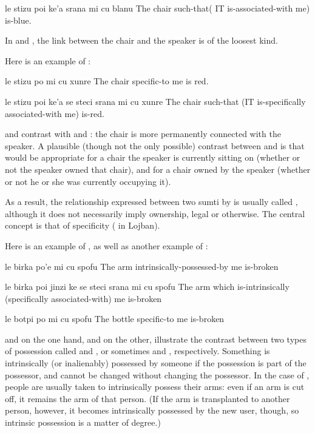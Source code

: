 \begin{example}
le stizu poi ke'a srana mi\n
\T	cu blanu\n
The chair such-that( IT is-associated-with me)\n
\T	is-blue.
\end{example}

In  and , the link between the chair and
    the speaker is of the loosest kind.

Here is an example of :
\begin{example}
le stizu po mi cu xunre\n
The chair specific-to me is red.
\end{example}

\begin{example}
le stizu poi\n
\T	ke'a se steci srana mi cu xunre\n
The chair such-that\n
\T	(IT is-specifically associated-with me) is-red.
\end{example}

 and  contrast with  and : the chair is more permanently
    connected with the speaker. A plausible (though not the only
    possible) contrast between  and
     is that  would be
    appropriate for a chair the speaker is currently sitting on
    (whether or not the speaker owned that chair), and 
    for a chair owned by the speaker (whether or not he or she was
    currently occupying it). 

As a result, the relationship expressed between two sumti by
     is usually called , although it does not
    necessarily imply ownership, legal or otherwise. The central
    concept is that of specificity ( in Lojban).

Here is an example of , as well as another example
    of :
\begin{example}
le birka po'e mi cu spofu\n
The arm intrinsically-possessed-by me is-broken
\end{example}

\begin{example}
le birka poi\n
\T	jinzi ke se steci srana mi\n
\T	cu spofu\n
The arm which\n
\T	is-intrinsically (specifically associated-with) me\n
\T	is-broken
\end{example}

\begin{example}
le botpi po mi cu spofu\n
The bottle specific-to me is-broken
\end{example}

 and  on the one hand, and  on
    the other, illustrate the contrast between two types of
    possession called  and , or sometimes
     and , respectively. Something is
    intrinsically (or inalienably) possessed by someone if the
    possession is part of the possessor, and cannot be changed
    without changing the possessor. In the case of , people are usually taken to
    intrinsically possess their arms: even if an arm is cut off, it
    remains the arm of that person. (If the arm is transplanted to
    another person, however, it becomes intrinsically possessed by
    the new user, though, so intrinsic possession is a matter of
    degree.) 

